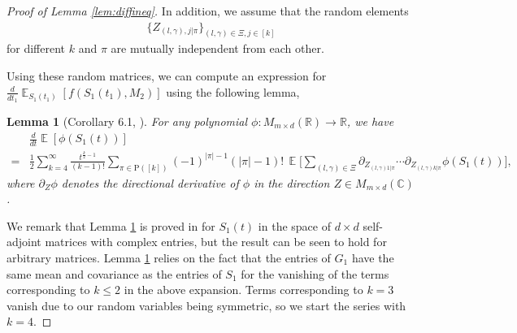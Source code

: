 \documentclass[11pt]{amsart}
\numberwithin{equation}{section}
\numberwithin{equation}{section}
\DeclareMathOperator{\E}{\mathbb{E}}
\newtheorem{lemma}[theorem]{Lemma}
\theoremstyle{remark}
\theoremstyle{definition}
\begin{document}
\begin{proof}[Proof of Lemma \ref{lem:diffineq}]
In addition, we assume that the random elements
\begin{align*}
\{Z_{(l,\gamma),j|\pi}\}_{(l,\gamma)\in \Xi, j \in [k]}
\end{align*}
for different $k$ and $\pi$ are mutually independent from each other.

Using these random matrices, we can compute an expression for $\frac{d}{dt_1}\E_{S_1(t_1)}[f(S_1(t_1),M_2)]$ using the following lemma,

\begin{lemma}[Corollary 6.1, \cite{brailovskaya2022universality}] \label{lem:derexpansion}
    For any polynomial $\phi:M_{m\times d}(\mathbb{R})\to\mathbb{R}$, we have
\begin{align*}
	&\frac{d}{dt}\E[\phi(S_1(t))] \\=& 
	\frac{1}{2}\sum_{k=4}^\infty
	\frac{t^{\frac{k}{2}-1}}{(k-1)!}
	\sum_{\pi\in\mathrm{P}([k])}
	(-1)^{|\pi|-1}(|\pi|-1)!\,
	\E\Bigg[ \sum_{(l,\gamma) \in \Xi}\partial_{Z_{(l,\gamma)1|\pi}}\cdots\partial_{Z_{(l,\gamma)k|\pi}}\phi(S_1(t))
	\Bigg],
\end{align*}
where $\partial_Z\phi$ denotes the directional derivative of
$\phi$ in the direction $Z\in M_{m\times d}(\mathbb{C})$.
\end{lemma}

We remark that Lemma \ref{lem:derexpansion} is proved in \cite{brailovskaya2022universality} for $S_1(t)$ in the space of $d \times d$ self-adjoint matrices with complex entries, but the result can be seen to hold for arbitrary matrices. Lemma \ref{lem:derexpansion} relies on the fact that the entries of $G_1$ have the same mean and covariance as the entries of $S_1$ for the vanishing of the terms corresponding to $k \le 2$ in the above expansion. Terms corresponding to $k=3$ vanish due to our random variables being symmetric, so we start the series with $k=4$.


\end{proof}
\end{document}

